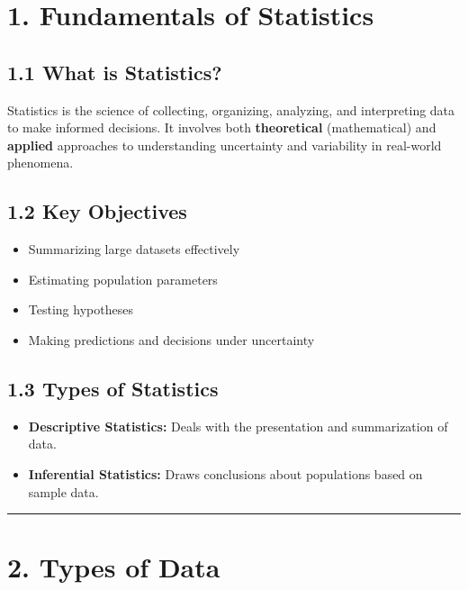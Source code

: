 \documentclass[
  letterpaper,
  DIV=11,
  numbers=noendperiod]{scrreprt}
\providecommand{\tightlist}{%
  \setlength{\itemsep}{0pt}\setlength{\parskip}{0pt}}
\begin{document}
\section{1. Fundamentals of
Statistics}\label{fundamentals-of-statistics}

\subsection{1.1 What is Statistics?}\label{what-is-statistics}

Statistics is the science of collecting, organizing, analyzing, and
interpreting data to make informed decisions. It involves both
\textbf{theoretical} (mathematical) and \textbf{applied} approaches to
understanding uncertainty and variability in real-world phenomena.

\subsection{1.2 Key Objectives}\label{key-objectives}

\begin{itemize}
\tightlist
\item
  Summarizing large datasets effectively
\item
  Estimating population parameters
\item
  Testing hypotheses
\item
  Making predictions and decisions under uncertainty
\end{itemize}

\subsection{1.3 Types of Statistics}\label{types-of-statistics}

\begin{itemize}
\tightlist
\item
  \textbf{Descriptive Statistics:} Deals with the presentation and
  summarization of data.
\item
  \textbf{Inferential Statistics:} Draws conclusions about populations
  based on sample data.
\end{itemize}

\begin{center}\rule{0.5\linewidth}{0.5pt}\end{center}

\section{2. Types of Data}\label{types-of-data}
\end{document}

